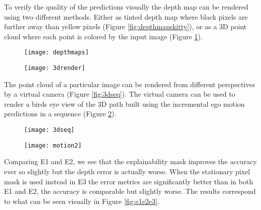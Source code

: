 To verify the quality of the predictions visually the depth map can be rendered using two different methods. Either as tinted depth map where black pixels are further away than yellow pixels (Figure \ref{fig:depthmapskitty}), or as a 3D point cloud where each point is colored by the input image (Figure \ref{fig:3drender}).

\begin{figure}[H]
	\centering
	\begin{minipage}{.5\textwidth}
		\centering
		\texttt{[image: depthmaps]}
		\label{fig:depthmapskitty}
	\end{minipage}%
	\begin{minipage}{.5\textwidth}
		\centering
		\texttt{[image: 3drender]}
		\label{fig:3drender}
	\end{minipage}
\end{figure}

The point cloud of a particular image can be rendered from different perspectives by a virtual camera (Figure \ref{fig:3dseq}). The virtual camera can be used to render a birds eye view of the 3D path built using the incremental ego motion predictions in a sequence (Figure \ref{fig:movement}).

\begin{figure}[H]
	\centering
	\begin{minipage}{.5\textwidth}
		\centering
		\texttt{[image: 3dseq]}
		\label{fig:3dseq}
	\end{minipage}%
	\begin{minipage}{.5\textwidth}
		\centering
		\texttt{[image: motion2]}
		\label{fig:movement}
	\end{minipage}
\end{figure}

Comparing E1 and E2, we see that the explainability mask improves the accuracy ever so slightly but the depth error is actually worse. When the stationary pixel mask is used instead in E3 the error metrics are significantly better than in both E1 and E2, the accuracy is comparable but slightly worse. The results correspond to what can be seen visually in Figure \ref{fig:e1e2e3}.

